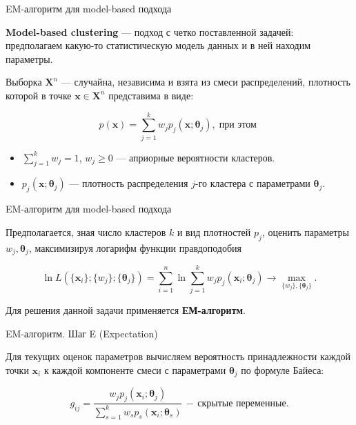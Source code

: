 \documentclass[unicode, notheorems, handout]{beamer}
\begin{document}
\begin{frame}{EM-алгоритм для model-based подхода}

\textbf{Model-based clustering} --- подход с четко поставленной задачей: предполагаем какую-то статистическую модель данных и в ней находим параметры.
\vspace{0.5ex}

Выборка $\pmb{X}^n$ --- случайна, независима и взята из смеси распределений, плотность которой в точке $\pmb{x} \in \pmb{X}^n$ представима в  виде:

$$p(\pmb{x}) = \sum\limits_{j = 1}^k w_j p_j(\pmb{x}; \pmb{\theta}_j),\; \text{при этом }$$
\vspace{-2ex}

\begin{itemize}
    \item $\sum\limits_{j = 1}^k w_j = 1$, $w_j \geq 0$ --- априорные вероятности кластеров.
    \vspace{1ex}
    
    \item  $p_j(\pmb{x}; \pmb{\theta}_j)$ --- плотность распределения $j$-го кластера с параметрами $\pmb{\theta}_j$.
\end{itemize}
\end{frame}


\begin{frame}{EM-алгоритм для model-based подхода}

Предполагается, зная число кластеров $k$ и вид плотностей $p_j$, оценить параметры $w_j, \pmb{\theta}_j$, максимизируя логарифм функции правдоподобия

$$ \ln L(\{\pmb{x}_i\}; \{w_j\}; \{\pmb{\theta}_j\}) = \sum_{i=1}^n \ln \sum_{j=1}^k w_j p_j(\pmb{x}_i; \pmb{\theta}_j) \rightarrow \max_{\{w_j\}, \{\pmb{\theta}_j\}}.$$

Для решения данной задачи применяется \textbf{ЕМ-алгоритм}.
\end{frame}



\begin{frame}{EM-алгоритм. Шаг E (Expectation)}

Для текущих оценок параметров вычисляем вероятность принадлежности каждой точки $\pmb{x}_i$ к каждой компоненте смеси с параметрами $\pmb{\theta}_j$ по формуле Байеса:

$$g_{ij} = \frac{w_j p_j(\pmb{x}_i; \pmb{\theta}_j)}{\sum\limits_{s=1}^k w_{s} p_{s}(\pmb{x}_i; \pmb{\theta}_s) } \,-\, \text{скрытые переменные}.$$
    
\end{frame}
\end{document}

